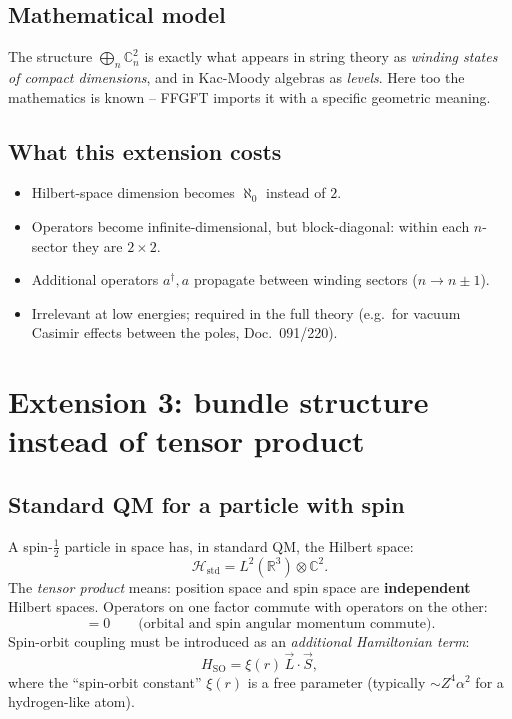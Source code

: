 \subsection{Mathematical model}

The structure $\bigoplus_n \mathbb{C}^2_n$ is exactly what appears
in string theory as \emph{winding states of compact dimensions},
and in Kac-Moody algebras as \emph{levels}. Here too the mathematics
is known -- FFGFT imports it with a specific geometric meaning.

\subsection{What this extension costs}

\begin{itemize}[leftmargin=2em,itemsep=2pt,topsep=2pt]
  \item Hilbert-space dimension becomes $\aleph_0$ instead of $2$.
  \item Operators become infinite-dimensional, but block-diagonal:
        within each $n$-sector they are $2\times 2$.
  \item Additional operators $a^\dagger, a$ propagate between
        winding sectors ($n \to n \pm 1$).
  \item Irrelevant at low energies; required in the full theory
        (e.g.\ for vacuum Casimir effects between the poles, Doc.~091/220).
\end{itemize}

\section{Extension 3: bundle structure instead of tensor product}

\subsection{Standard QM for a particle with spin}

A spin-$\tfrac{1}{2}$ particle in space has, in standard QM, the
Hilbert space:
\begin{equation}
  \mathcal{H}_{\text{std}} = L^2(\mathbb{R}^3) \otimes \mathbb{C}^2.
\end{equation}
The \emph{tensor product} means: position space and spin space are
\textbf{independent} Hilbert spaces. Operators on one factor commute
with operators on the other:
\begin{equation}
  [L_i, S_j] = 0
  \qquad \text{(orbital and spin angular momentum commute)}.
\end{equation}
Spin-orbit coupling must be introduced as an \emph{additional
Hamiltonian term}:
\begin{equation}
  H_{\text{SO}} = \xi(r)\, \vec L \cdot \vec S,
\end{equation}
where the \enquote{spin-orbit constant} $\xi(r)$ is a free parameter
(typically $\sim Z^4 \alpha^2$ for a hydrogen-like atom).

